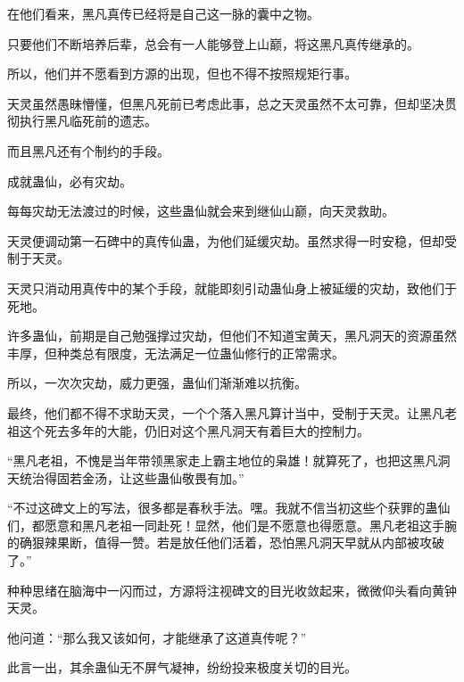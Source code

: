 \begin{this_body}
在他们看来，黑凡真传已经将是自己这一脉的囊中之物。

只要他们不断培养后辈，总会有一人能够登上山巅，将这黑凡真传继承的。

所以，他们并不愿看到方源的出现，但也不得不按照规矩行事。

天灵虽然愚昧懵懂，但黑凡死前已考虑此事，总之天灵虽然不太可靠，但却坚决贯彻执行黑凡临死前的遗志。

而且黑凡还有个制约的手段。

成就蛊仙，必有灾劫。

每每灾劫无法渡过的时候，这些蛊仙就会来到继仙山巅，向天灵救助。

天灵便调动第一石碑中的真传仙蛊，为他们延缓灾劫。虽然求得一时安稳，但却受制于天灵。

天灵只消动用真传中的某个手段，就能即刻引动蛊仙身上被延缓的灾劫，致他们于死地。

许多蛊仙，前期是自己勉强撑过灾劫，但他们不知道宝黄天，黑凡洞天的资源虽然丰厚，但种类总有限度，无法满足一位蛊仙修行的正常需求。

所以，一次次灾劫，威力更强，蛊仙们渐渐难以抗衡。

最终，他们都不得不求助天灵，一个个落入黑凡算计当中，受制于天灵。让黑凡老祖这个死去多年的大能，仍旧对这个黑凡洞天有着巨大的控制力。

“黑凡老祖，不愧是当年带领黑家走上霸主地位的枭雄！就算死了，也把这黑凡洞天统治得固若金汤，让这些蛊仙敬畏有加。”

“不过这碑文上的写法，很多都是春秋手法。嘿。我就不信当初这些个获罪的蛊仙们，都愿意和黑凡老祖一同赴死！显然，他们是不愿意也得愿意。黑凡老祖这手腕的确狠辣果断，值得一赞。若是放任他们活着，恐怕黑凡洞天早就从内部被攻破了。”

种种思绪在脑海中一闪而过，方源将注视碑文的目光收敛起来，微微仰头看向黄钟天灵。

他问道：“那么我又该如何，才能继承了这道真传呢？”

此言一出，其余蛊仙无不屏气凝神，纷纷投来极度关切的目光。

\end{this_body}

